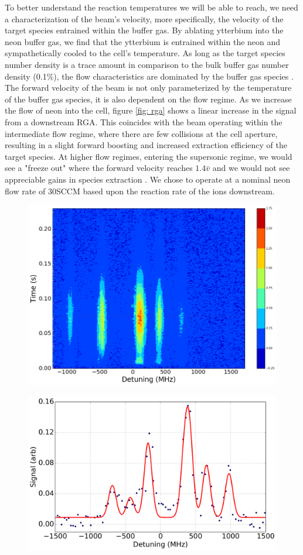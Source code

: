 To better understand the reaction temperatures we will be able to reach, we need a characterization of the beam's velocity, more specifically, the velocity of the target species entrained within the buffer gas. By ablating ytterbium into the neon buffer gas, we find that the ytterbium is entrained within the neon and sympathetically cooled to the cell's temperature. As long as the target species number density is a trace amount in comparison to the bulk buffer gas number density (0.1\%), the flow characteristics are dominated by the buffer gas species \cite{Hutzler2012}. The forward velocity of the beam is not only parameterized by the temperature of the buffer gas species, it is also dependent on the flow regime. As we increase the flow of neon into the cell, figure \ref{fig: rga} shows a linear increase in the  signal from a downstream RGA. This coincides with the beam operating within the intermediate flow regime, where there are few collisions at the cell aperture, resulting in a slight forward boosting and increased extraction efficiency of the target species. At higher flow regimes, entering the supersonic regime, we would see a "freeze out" where the forward velocity reaches $1.4\bar{v}$ and we would not see appreciable gains in species extraction \cite{Hutzler2012}. We chose to operate at a nominal neon flow rate of 30SCCM based upon the reaction rate of the ions downstream.

\begin{figure}[H]
	\centering
	\includegraphics[width=1\textwidth]{images/CBGB_Yb_spectrum_scan.png}
	\caption{}
	\label{fig: yb_spectrum_scan}
\end{figure}

\begin{figure}[H]
	\centering
	\includegraphics[width=1\textwidth]{images/CBGB_Yb_spectrum_long.png}
	\caption{}
	\label{fig: yb_spectrum}
\end{figure}